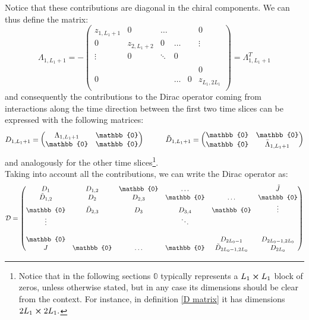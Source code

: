 Notice that these contributions are diagonal in the chiral components. We can thus define the matrix:
\begin{equation}
    \Lambda_{1, L_1 + 1} = - \begin{pmatrix}
        z_{1, L_1 + 1} & 0 & \dots &  & & 0  \\
        0 & z_{2, L_1 + 2} & 0 & \dots &  & \vdots \\
        \vdots & 0 & \ddots & 0 \\
        \\
        & & & & &  0 \\
        0 & & & \dots & 0 & z_{L_1, 2L_1} \\ 
    \end{pmatrix} = \Lambda^{T}_{1, L_1 + 1}
\end{equation}
and consequently the contributions to the Dirac operator coming from interactions along the time direction between the first two time slices can be expressed with the following matrices:
\begin{equation} \label{time interaction matrix}
    D_{1, L_1 + 1} = \begin{pmatrix}
        \Lambda_{1, L_1 + 1} & \mathbb{0} \\
        \mathbb{0} & \mathbb{0} \\
    \end{pmatrix} \hspace{10mm} \Tilde{D}_{1, L_1 + 1} = \begin{pmatrix}
        \mathbb{0} & \mathbb{0} \\
        \mathbb{0} & \Bar{\Lambda}_{1, L_1 + 1} \\
    \end{pmatrix}
\end{equation}
and analogously for the other time slices\footnote{Notice that in the following sections $\mathbb{0}$ typically represents a $L_1 \cross L_1$ block of zeros, unless otherwise stated, but in any case its dimensions should be clear from the context. For instance, in definition \eqref{D matrix} it has dimensions $2L_1 \cross 2L_1.$}. 
\\ Taking into account all the contributions, we can write the Dirac operator as:
\begin{equation}\label{D matrix}
    \mathcal{D} = \begin{pmatrix}
        D_1 & D_{1,2} & \mathbb{0} & \dots &  & \Tilde{J}  \\
        \Tilde{D}_{1,2} & D_2 & D_{2,3} & \mathbb{0} & \dots & \mathbb{0} \\
        \mathbb{0} & \Tilde{D}_{2,3} & D_3 & D_{3,4} & \mathbb{0} & \vdots \\
        \vdots & & & \ddots & \\
        \\
        \mathbb{0} & & & & D_{2L_0 - 1} & D_{2L_0 - 1, 2L_0} \\
        J & \mathbb{0} & \dots & \mathbb{0} & \Tilde{D}_{2L_0 - 1, 2L_0} & D_{2L_0} \\ 
    \end{pmatrix}
\end{equation}
